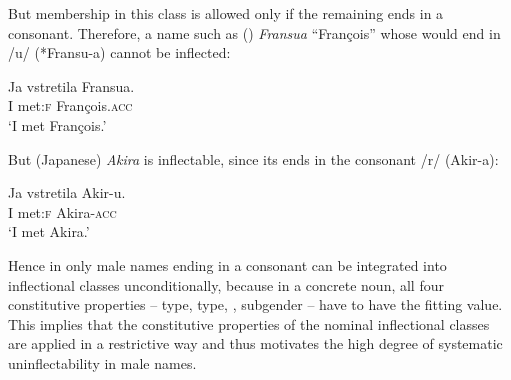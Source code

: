 \documentclass[output=paper,colorlinks,citecolor=brown]{langscibook}
\begin{document}
But membership in this class is allowed only if the remaining  ends in a consonant. Therefore, a name such as () \emph{Fransua} ``François'' whose  would end in /u/ (*Fransu-a) cannot be inflected:

\begin{exe}
	\ex \gll Ja vstretila Fransua. \\
	I met:\textsc{f} François.\textsc{acc} \\
	\trans `I met François.'
\end{exe}

But (Japanese) \emph{Akira} is inflectable, since its  ends in the consonant /r/ (Akir-a):

\begin{exe}
	\ex \gll Ja vstretila Akir-u. \\
	I met:\textsc{f} Akira-\textsc{acc} \\
	\trans `I met Akira.'
\end{exe}

Hence in  only male names ending in a consonant can be integrated into inflectional classes unconditionally, because in a concrete noun, all four constitutive properties --  type,  type, , subgender -- have to have the fitting value. This implies that the constitutive properties of the  nominal inflectional classes are applied in a restrictive way and thus motivates the high degree of systematic uninflectability in male names.
\end{document}
